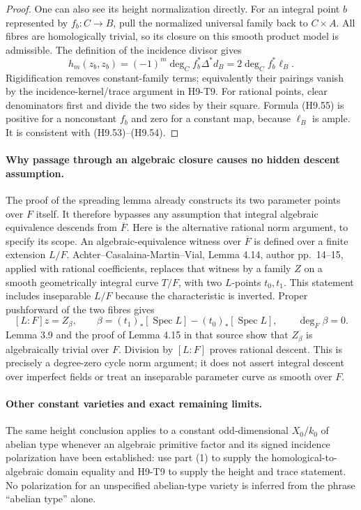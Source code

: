 \begin{proof}
One can also see its height normalization directly. For an integral
point $b$ represented by $f_b:C\to B$, pull the normalized universal
family back to $C\times A$. All fibres are homologically trivial,
so its closure on this smooth product model is admissible. The
definition of the incidence divisor gives
\[
 h_m(z_b,z_b)
      =(-1)^m\deg_C f_b^*\Delta^*d_B
      =2\deg_C f_b^*\ell_B.                               \tag{H9.55}
\]
Rigidification removes constant-family terms; equivalently their
pairings vanish by the incidence-kernel/trace argument in H9-T9.
For rational points, clear denominators first and divide the two
sides by their square. Formula (H9.55) is positive for a nonconstant
$f_b$ and zero for a constant map, because $\ell_B$ is ample.
It is consistent with (H9.53)--(H9.54).
\end{proof}

\paragraph{Why passage through an algebraic closure causes no hidden descent assumption.}
The proof of the spreading lemma already constructs its two parameter
points over $F$ itself. It therefore bypasses any assumption that
integral algebraic equivalence descends from $\overline F$.
Here is the alternative rational norm argument, to specify its scope.
An algebraic-equivalence witness over $\overline F$ is defined over
a finite extension $L/F$. Achter--Casalaina-Martin--Vial, Lemma 4.14,
author pp.~14--15, applied with rational coefficients, replaces that
witness by a family $Z$ on a smooth geometrically integral curve
$T/F$, with two $L$-points $t_0,t_1$. This statement includes
inseparable $L/F$ because the characteristic is inverted. Proper
pushforward of the two fibres gives
\[
 [L:F]z
  =Z_{\beta},\qquad
 \beta=(t_1)_*[\operatorname{Spec}L]
            -(t_0)_*[\operatorname{Spec}L],\qquad
 \deg_F\beta=0.
\]
Lemma 3.9 and the proof of Lemma 4.15 in that source show that
$Z_\beta$ is algebraically trivial over $F$. Division by $[L:F]$
proves rational descent. This is precisely a degree-zero cycle
norm argument; it does not assert integral descent over imperfect
fields or treat an inseparable parameter curve as smooth over $F$.

\paragraph{Other constant varieties and exact remaining limits.}
The same height conclusion applies to a constant odd-dimensional
$X_0/k_0$ of abelian type whenever an algebraic primitive factor and
its signed incidence polarization have been established: use part (1)
to supply the homological-to-algebraic domain equality and H9-T9 to
supply the height and trace statement. No polarization for an
unspecified abelian-type variety is inferred from the phrase
``abelian type'' alone.

